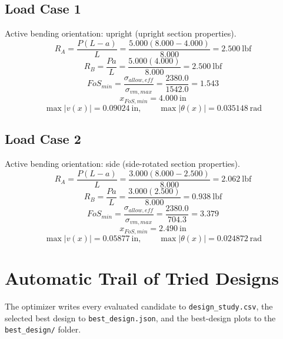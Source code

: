 \documentclass[11pt]{article}
\begin{document}
\subsection*{Load Case 1}
Active bending orientation: upright (upright section properties).
\[R_A = \frac{P(L-a)}{L} = \frac{5.000(8.000-4.000)}{8.000} = 2.500\ \mathrm{lbf}\]
\[R_B = \frac{Pa}{L} = \frac{5.000(4.000)}{8.000} = 2.500\ \mathrm{lbf}\]
\[FoS_{min} = \frac{\sigma_{allow,eff}}{\sigma_{vm,max}} = \frac{2380.0}{1542.0} = 1.543\]
\[x_{FoS,min} = 4.000\ \mathrm{in}\]
\[\max |v(x)| = 0.09024\ \mathrm{in}, \qquad \max |\theta(x)| = 0.035148\ \mathrm{rad}\]
\subsection*{Load Case 2}
Active bending orientation: side (side-rotated section properties).
\[R_A = \frac{P(L-a)}{L} = \frac{3.000(8.000-2.500)}{8.000} = 2.062\ \mathrm{lbf}\]
\[R_B = \frac{Pa}{L} = \frac{3.000(2.500)}{8.000} = 0.938\ \mathrm{lbf}\]
\[FoS_{min} = \frac{\sigma_{allow,eff}}{\sigma_{vm,max}} = \frac{2380.0}{704.3} = 3.379\]
\[x_{FoS,min} = 2.490\ \mathrm{in}\]
\[\max |v(x)| = 0.05877\ \mathrm{in}, \qquad \max |\theta(x)| = 0.024872\ \mathrm{rad}\]

\section*{Automatic Trail of Tried Designs}
The optimizer writes every evaluated candidate to \texttt{design\_study.csv}, the selected best design to \texttt{best\_design.json}, and the best-design plots to the \texttt{best\_design/} folder.
\end{document}

